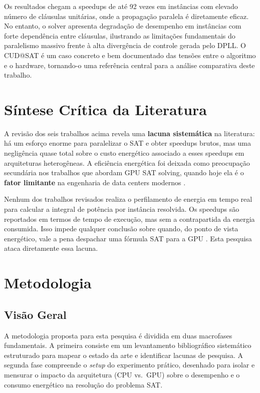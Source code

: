 \documentclass[12pt]{article}
\begin{document}
Os resultados chegam a speedups de até 92 vezes em instâncias com elevado número de cláusulas unitárias, onde a propagação paralela é diretamente eficaz. No entanto, o solver apresenta degradação de desempenho em instâncias com forte dependência entre cláusulas, ilustrando as limitações fundamentais do paralelismo massivo frente à alta divergência de controle gerada pelo DPLL. O CUD@SAT é um caso concreto e bem documentado das tensões entre o algoritmo e o hardware, tornando-o uma referência central para a análise comparativa deste trabalho.

\section{Síntese Crítica da Literatura}

A revisão dos seis trabalhos acima revela uma \textbf{lacuna sistemática} na literatura: há um esforço enorme para paralelizar o SAT e obter speedups brutos, mas uma negligência quase total sobre o custo energético associado a esses speedups em arquiteturas heterogêneas. A eficiência energética foi deixada como preocupação secundária nos trabalhos que abordam GPU SAT solving, quando hoje ela é o \textbf{fator limitante} na engenharia de data centers modernos \cite{barroso:2018}.

Nenhum dos trabalhos revisados realiza o perfilamento de energia em tempo real para calcular a integral de potência por instância resolvida. Os speedups são reportados em termos de tempo de execução, mas sem a contrapartida da energia consumida. Isso impede qualquer conclusão sobre quando, do ponto de vista energético, vale a pena despachar uma fórmula SAT para a GPU \cite{mittal:2015}. Esta pesquisa ataca diretamente essa lacuna.

\section{Metodologia}

\subsection{Visão Geral}
A metodologia proposta para esta pesquisa é dividida em duas macrofases fundamentais. A primeira consiste em um levantamento bibliográfico sistemático estruturado para mapear o estado da arte e identificar lacunas de pesquisa. A segunda fase compreende o \textit{setup} do experimento prático, desenhado para isolar e mensurar o impacto da arquitetura (CPU vs.\ GPU) sobre o desempenho e o consumo energético na resolução do problema SAT.
\end{document}
